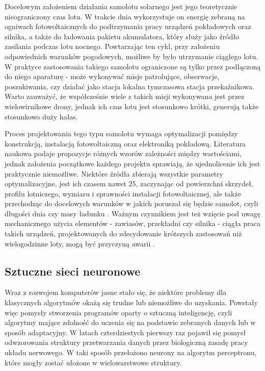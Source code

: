 \documentclass[12pt, a4paper]{article}
\begin{document}
Docelowym założeniem działania samolotu solarnego jest jego teoretycznie nieograniczony czas lotu. W trakcie dnia wykorzystuje on energię zebraną na ogniwach fotowoltaicznych do podtrzymania pracy urządzeń pokładowych oraz silnika, a także do ładowania pakietu akumulatora, który służy jako źródło zasilania podczas lotu nocnego. Powtarzając ten cykl, przy założeniu odpowiednich warunków pogodowych, możliwe by było utrzymanie ciągłego lotu. W praktyce zastosowania takiego samolotu ograniczone są tylko przez podłączoną do niego aparaturę - może wykonywać misje patrolujące, obserwacje, poszukiwania, czy działać jako stacja lokalna tymczasowa stacja przekaźnikowa. Warto zauważyć, że współcześnie wiele z takich misji wykonywana jest przez wielowirnikowe drony, jednak ich czas lotu jest stosunkowo krótki, generują także stosunkowo duży hałas.

Proces projektowania tego typu samolotu wymaga optymalizacji pomiędzy konstrukcją, instalacją fotowoltaiczną oraz elektroniką pokładową. Literatura naukowa podaje propozycje różnych wzorów zależności między wartościami, jednak założenia początkowe każdego projektu sprawiają, że ujednolicenie ich jest praktycznie niemożliwe. Niektóre źródła zbierają wszystkie parametry optymalizacyjne, jest ich czasem nawet 25, zaczynając od powierzchni skrzydeł, profilu lotniczego, wymiaru i sprawności instalacji fotowoltaicznej, ale także przechodząc do docelowych warunków w jakich poruszał się będzie samolot, czyli długości dnia czy masy ładunku \cite{robotics}. Ważnym czynnikiem jest też wzięcie pod uwagę mechanicznego użycia elementów - zawiasów, przekładni czy silnika - ciągła praca takich urządzeń, projektowanych do zdecydowanie krótszych zastosowań niż wielogodzinne loty, mogą być przyczyną awarii \cite{developing a solar}. 

\subsection{Sztuczne sieci neuronowe}
Wraz z rozwojem komputerów jasne stało się, że niektóre problemy dla klasycznych algorytmów okażą się trudne lub niemożliwe do uzyskania. Powstały więc pomysły stworzenia programów oparty o sztuczną inteligencję, czyli algorytmy mające zdolność do uczenia się na podstawie zebranych danych lub w sposób adaptacyjny. W latach czterdziestych pierwszy raz pojawił się pomysł odwzorowania struktury przetwarzania danych przez biologiczną zasadę pracy układu nerwowego. W taki sposób przełożono neurony na algorytm perceptronu, które mogły zostać ułożone w wielowarstwowe struktury. 
\end{document}
